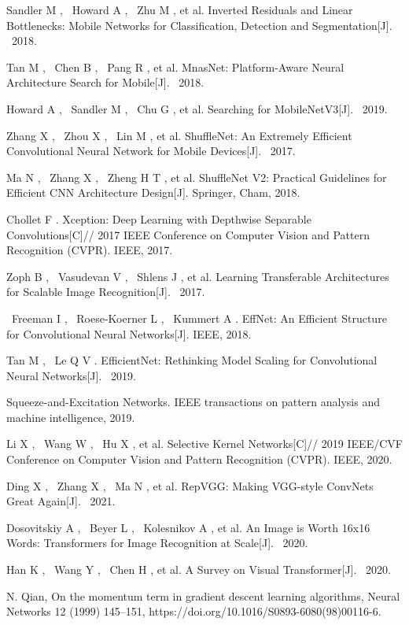 \documentclass[15pt]{article}
\begin{document}
\begin{thebibliography}{99}
 Sandler M ,  Howard A ,  Zhu M , et al. Inverted Residuals and Linear Bottlenecks: Mobile Networks for Classification, Detection and Segmentation[J].  2018.

 Tan M ,  Chen B ,  Pang R , et al. MnasNet: Platform-Aware Neural Architecture Search for Mobile[J].  2018.

 Howard A ,  Sandler M ,  Chu G , et al. Searching for MobileNetV3[J].  2019.

 Zhang X ,  Zhou X ,  Lin M , et al. ShuffleNet: An Extremely Efficient Convolutional Neural Network for Mobile Devices[J].  2017.

 Ma N ,  Zhang X ,  Zheng H T , et al. ShuffleNet V2: Practical Guidelines for Efficient CNN Architecture Design[J]. Springer, Cham, 2018.

 Chollet F . Xception: Deep Learning with Depthwise Separable Convolutions[C]// 2017 IEEE Conference on Computer Vision and Pattern Recognition (CVPR). IEEE, 2017.

 Zoph B ,  Vasudevan V ,  Shlens J , et al. Learning Transferable Architectures for Scalable Image Recognition[J].  2017.

 Freeman I ,  Roese-Koerner L ,  Kummert A . EffNet: An Efficient Structure for Convolutional Neural Networks[J]. IEEE, 2018.

 Tan M ,  Le Q V . EfficientNet: Rethinking Model Scaling for Convolutional Neural Networks[J].  2019.

 Squeeze-and-Excitation Networks. IEEE transactions on pattern analysis and machine intelligence, 2019.

 Li X ,  Wang W ,  Hu X , et al. Selective Kernel Networks[C]// 2019 IEEE/CVF Conference on Computer Vision and Pattern Recognition (CVPR). IEEE, 2020.

 Ding X ,  Zhang X ,  Ma N , et al. RepVGG: Making VGG-style ConvNets Great Again[J].  2021.

 Dosovitskiy A ,  Beyer L ,  Kolesnikov A , et al. An Image is Worth 16x16 Words: Transformers for Image Recognition at Scale[J].  2020.

 Han K ,  Wang Y ,  Chen H , et al. A Survey on Visual Transformer[J].  2020.

 N. Qian, On the momentum term in gradient descent learning algorithms, Neural Networks 12 (1999) 145–151, https://doi.org/10.1016/S0893-6080(98)00116-6.


\end{thebibliography}
\end{document}
